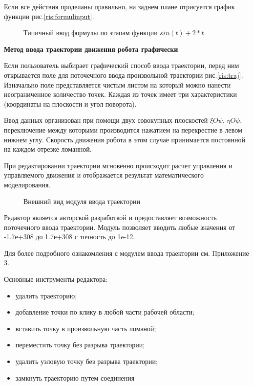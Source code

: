 Если все действия проделаны правильно, на заднем плане отрисуется график функции рис.\eqref{ris:formulinput}.

\begin{figure}[h]
\caption{Типичный ввод формулы по этапам функции $sin(t)+2*t$}
\label{ris:formulinput}
\end{figure}

\par
\textbf{Метод ввода траектории движения робота графически}

Если пользователь выбирает графический способ ввода траектории, перед ним открывается поле для поточечного ввода произвольной траектории рис.\eqref{ris:traj}. Изначально поле представляется чистым листом на который можно нанести неограниченное количество точек. Каждая из точек имеет три характеристики (координаты на плоскости и угол поворота). 

Ввод данных организован при помощи двух совокупных плоскостей  $\xi O\psi$, $\eta O\psi$, переключение между которыми производится нажатием на перекрестие в левом нижнем углу. Скорость движения робота в этом случае принимается постоянной на каждом отрезке  ломанной.

При редактировании траектории мгновенно происходит расчет управления и управляемого движения и отображается результат математического моделирования.

\begin{figure}[h]
\caption{Внешний вид модуля ввода траектории}
\label{ris:traj}
\end{figure}

Редактор является авторской разработкой и предоставляет возможность поточечного ввода траектории. Модуль позволяет вводить любые значения от -1.7е+308 до 1.7е+308 с точность до 1e-12.
	
Для более подробного ознакомления с модулем ввода траектории см. Приложение 3.

Основные инструменты редактора:
\begin{itemize}
\item{удалить траекторию;}
\item{добавление точки по клику в любой части рабочей области;}
\item{вставить точку в произвольную часть ломаной;}
\item{переместить точку без разрыва траектории;}
\item{удалить узловую точку без разрыва траектории;}
\item{замкнуть траекторию путем соединения }
\end{itemize}

